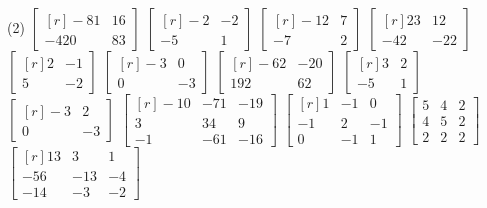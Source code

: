 \begin{tasks}[
    style=enumerate,
    label-offset = 3mm,
    ](2)
    \task $\begin{bmatrix*}[r]-81 & 16 \\ -420 & 83\end{bmatrix*}$
    \task $\begin{bmatrix*}[r]-2 & -2 \\ -5 & 1\end{bmatrix*}$
    \task $\begin{bmatrix*}[r]-12 & 7 \\ -7 & 2\end{bmatrix*}$
    \task $\begin{bmatrix*}[r]23 & 12 \\ -42 & -22\end{bmatrix*}$
    \task $\begin{bmatrix*}[r]2 & -1 \\ 5 & -2\end{bmatrix*}$
    \task $\begin{bmatrix*}[r]-3 & 0 \\ 0 & -3\end{bmatrix*}$
    \task $\begin{bmatrix*}[r]-62 & -20 \\ 192 & 62\end{bmatrix*}$
    \task $\begin{bmatrix*}[r]3 & 2 \\ -5 & 1\end{bmatrix*}$
    \task $\begin{bmatrix*}[r]-3 & 2 \\ 0 & -3\end{bmatrix*}$
    \task $\begin{bmatrix*}[r]-10 & -71 & -19 \\ 3 & 34 & 9 \\ -1 & -61 & -16\end{bmatrix*}$
    \task $\begin{bmatrix*}[r]1 & -1 & 0 \\ -1 & 2 & -1 \\ 0 & -1 & 1\end{bmatrix*}$
    \task $\begin{bmatrix*}5 & 4 & 2 \\ 4 & 5 & 2 \\ 2 & 2 & 2\end{bmatrix*}$
    \task $\begin{bmatrix*}[r]13 & 3 & 1 \\ -56 & -13 & -4 \\ -14 & -3 & -2\end{bmatrix*}$

\end{tasks}
